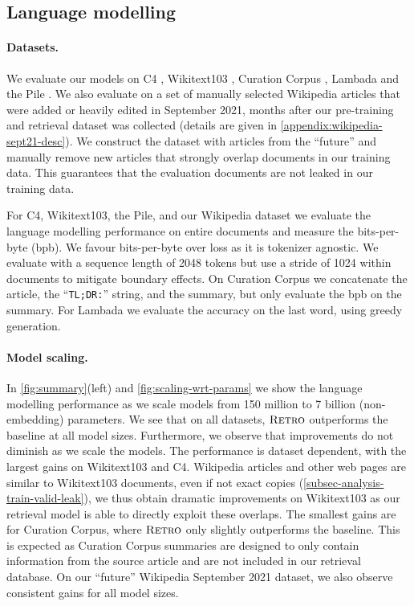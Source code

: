 \label{sec-results}
\subsection{Language modelling}
\label{subsec-scaling}

\paragraph{Datasets.}
We evaluate our models on C4 \citep{raffel2019t5}, Wikitext103 \citep{merity2016pointer}, Curation Corpus \citep{curationcorpusbase2020}, Lambada \citep{paperno2016lambada} and the Pile \citep{pile}. We also evaluate on a set of manually selected Wikipedia articles that were added or heavily edited in September 2021, months after our pre-training and retrieval dataset was collected (details are given in \autoref{appendix:wikipedia-sept21-desc}).
We construct the dataset with articles from the ``future'' and manually remove new articles that strongly overlap documents in our training data. This guarantees that the evaluation documents are not leaked in our training data.

For C4, Wikitext103, the Pile, and our Wikipedia dataset we evaluate the language modelling performance on entire documents and measure the bits-per-byte (bpb). We favour bits-per-byte over loss as it is tokenizer agnostic. We evaluate with a sequence length of 2048 tokens but use a stride of 1024 within documents to mitigate boundary effects. On Curation Corpus we concatenate the article, the ``\texttt{TL;DR:}'' string, and the summary, but only evaluate the bpb on the summary. For Lambada we evaluate the accuracy on the last word, using greedy generation.

\paragraph{Model scaling.} In \autoref{fig:summary}(left) and \autoref{fig:scaling-wrt-params} we show the language modelling performance as we scale models from 150 million to 7 billion (non-embedding) parameters. We see that on all datasets, $\textsc{Retro}$ outperforms the baseline at all model sizes. Furthermore, we observe that improvements do not diminish as we scale the models. The performance is dataset dependent, with the largest gains on Wikitext103 and C4. Wikipedia articles and other web pages are similar to Wikitext103 documents, even if not exact copies (\autoref{subsec-analysis-train-valid-leak}), we thus obtain dramatic improvements on Wikitext103 as our retrieval model is able to directly exploit these overlaps. The smallest gains are for Curation Corpus, where $\textsc{Retro}$ only slightly outperforms the baseline. This is expected as Curation Corpus summaries are designed to only contain information from the source article and are not included in our retrieval database. On our ``future'' Wikipedia September 2021 dataset, we also observe consistent gains for all model sizes. 


